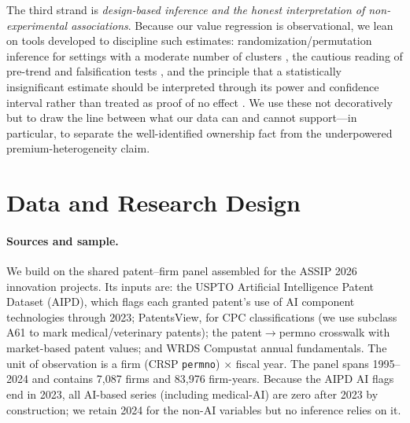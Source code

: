 \documentclass[12pt]{article}
\begin{document}
The third strand is \emph{design-based inference and the honest interpretation of non-experimental
associations}. Because our value regression is observational, we lean on tools developed to
discipline such estimates: randomization/permutation inference for settings with a moderate number
of clusters \citep{young2019}, the cautious reading of pre-trend and falsification tests
\citep{roth2022}, and the principle that a statistically insignificant estimate should be
interpreted through its power and confidence interval rather than treated as proof of no effect
\citep{abadie2020}. We use these not decoratively but to draw the line between what our data can and
cannot support---in particular, to separate the well-identified ownership fact from the
underpowered premium-heterogeneity claim.

\section{Data and Research Design}\label{sec:data}
\paragraph{Sources and sample.} We build on the shared patent--firm panel assembled for the ASSIP
2026 innovation projects. Its inputs are: the USPTO Artificial Intelligence Patent Dataset (AIPD),
which flags each granted patent's use of AI component technologies through 2023; PatentsView, for
CPC classifications (we use subclass A61 to mark medical/veterinary patents); the \citet{kpss2017}
patent$\to$permno crosswalk with market-based patent values; and WRDS Compustat annual
fundamentals. The unit of observation is a firm (CRSP \texttt{permno}) $\times$ fiscal year. The
panel spans 1995--2024 and contains 7{,}087 firms and 83{,}976 firm-years. Because the AIPD AI
flags end in 2023, all AI-based series (including medical-AI) are zero after 2023 by construction;
we retain 2024 for the non-AI variables but no inference relies on it.
\end{document}

